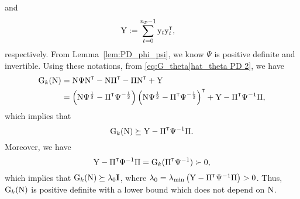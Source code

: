 and
\begin{equation}
\begin{split}
    \mxY &:= \sum_{t=0}^{\nD-1} \vcy_t \vcy_t^\tr, 
\end{split}
\end{equation}
respectively. From Lemma~\ref{lem:PD_phi_psi}, we know $\Psi$ is positive definite and invertible.  Using these notations, from \eqref{eq:G_theta|hat_theta PD 2}, we have
\begin{equation}
\begin{split}
    \mxG_k(\mxN) &= \mxN\Psi\mxN^\tr - \mxN \Pi^\tr - \Pi \mxN^\tr + \mxY
    \\ &
    = \left(\mxN\Psi^{\frac
    {1}{2}} - \Pi^\tr\Psi^{-\frac{1}{2}} \right) \left(\mxN\Psi^{\frac{1}{2}} - \Pi^\tr\Psi^{-\frac{1}{2}} \right)^\tr + \mxY - \Pi^\tr \Psi^{-1} \Pi,
\end{split}
\end{equation}
which implies that 
\begin{equation}
    \mxG_k(\mxN) \succeq \mxY - \Pi^\tr \Psi^{-1} \Pi.
\end{equation}
Moreover, we have
\begin{equation}
    \mxY - \Pi^\tr \Psi^{-1} \Pi = \mxG_k(\Pi^\tr \Psi^{-1}) \succ 0,
\end{equation}
which implies that ${ \mathrm{G} }_k({ \mathrm{N} }) \succeq \lambda_0 \mathbf{I}$, where $\lambda_0 = \lambda_{\min} \left(\mxY - \Pi^\tr \Psi^{-1} \Pi \right) > 0$. Thus, ${ \mathrm{G} }_k({ \mathrm{N} })$ is positive definite with a lower bound which does not depend on ${ \mathrm{N} }$.


